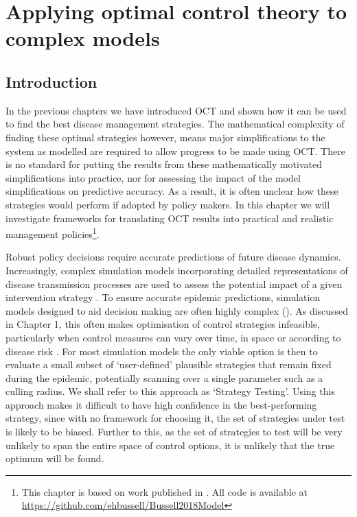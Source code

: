 %
\chapter{Applying optimal control theory to complex models\label{ch:complex_models}}


\section{Introduction\label{sec:ch4:Intro}}

In the previous chapters we have introduced OCT and shown how it can be used to find the best disease management strategies. The mathematical complexity of finding these optimal strategies however, means major simplifications to the system as modelled are required to allow progress to be made using OCT\@. There is no standard for putting the results from these mathematically motivated simplifications into practice, nor for assessing the impact of the model simplifications on predictive accuracy. As a result, it is often unclear how these strategies would perform if adopted by policy makers. In this chapter we will investigate frameworks for translating OCT results into practical and realistic management policies\footnote{This chapter is based on work published in \citet{bussell_applying_2019}. All code is available at \url{https://github.com/ehbussell/Bussell2018Model}}.

Robust policy decisions require accurate predictions of future disease dynamics. Increasingly, complex simulation models incorporating detailed representations of disease transmission processes are used to assess the potential impact of a given intervention strategy \citationneeded. To ensure accurate epidemic predictions, simulation models designed to aid decision making are often highly complex (). As discussed in Chapter 1, this often makes optimisation of control strategies infeasible, particularly when control measures can vary over time, in space or according to disease risk \citep{bellman_dynamic_1957}. For most simulation models the only viable option is then to evaluate a small subset of `user-defined' plausible strategies that remain fixed during the epidemic, potentially scanning over a single parameter such as a culling radius. We shall refer to this approach as `Strategy Testing'. Using this approach makes it difficult to have high confidence in the best-performing strategy, since with no framework for choosing it, the set of strategies under test is likely to be biased. Further to this, as the set of strategies to test will be very unlikely to span the entire space of control options, it is unlikely that the true optimum will be found.

